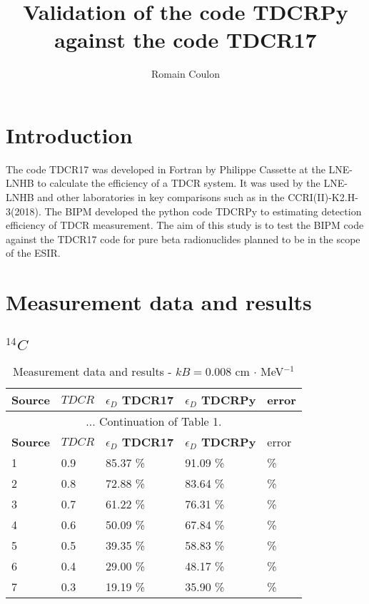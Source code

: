 \documentclass[12pt]{iopart}
\begin{document}
\title[Draft - May 2023]{Validation of the code TDCRPy against the code TDCR17}
\author{Romain Coulon}
\address{Bureau International des Poids et Mesures, Pavillon de Breteuil, F-92312 S\`{e}vres Cedex, France.}


\section{Introduction}

The code TDCR17 was developed in Fortran by Philippe Cassette at the LNE-LNHB to calculate the efficiency of a TDCR system. It was used by the LNE-LNHB and other laboratories in key comparisons such as in the CCRI(II)-K2.H-3(2018). The BIPM developed the python code TDCRPy to estimating detection efficiency of TDCR measurement. The aim of this study is to test the BIPM code against the TDCR17 code for pure beta radionuclides planned to be in the scope of the ESIR.\\


\section{Measurement data and results}
\subsection{$^{14}C$}

\begingroup
\footnotesize
\begin{longtable}[l]{| p{} | p{} |p{} |p{} |p{} |} 
\caption{Measurement data and results - $kB = 0.008$ cm $\cdot$ MeV$^{-1}$}
\label{Table1} \\ 
\hline
\textbf{Source} & \textbf{$TDCR$} & \textbf{$\epsilon_{D}$ TDCR17} & \textbf{$\epsilon_{D}$ TDCRPy} & error \\
\endfirsthead
\multicolumn{5}{c}{... Continuation of Table 1.}\\ 
\hline
 \textbf{Source} & \textbf{$TDCR$} & \textbf{$\epsilon_{D}$ TDCR17} & \textbf{$\epsilon_{D}$ TDCRPy} & error \\   \hline 
\endhead
\hline
 1 & 0.9   &   85.37 \% &   91.09 \% &   \% \\
 2 & 0.8   &   72.88 \% &   83.64 \% &   \% \\
 3 & 0.7   &   61.22 \% &   76.31 \% &   \% \\
 4 & 0.6   &   50.09 \% &   67.84 \% &   \% \\
 5 & 0.5   &   39.35 \% &   58.83 \% &   \% \\
 6 & 0.4   &   29.00 \% &   48.17 \% &   \% \\
 7 & 0.3   &   19.19 \% &   35.90 \% &   \% \\
\hline
\end{longtable} 
\endgroup
\end{document}
